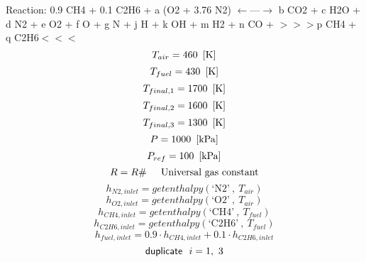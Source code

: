 \documentclass[10pt,fleqn]{article}
\newcommand{\F}[1]{\mbox{$#1$}}
\newcommand{\K}[1]{\mbox{\sf#1\ \ \mit}}
\newcommand{\SC}[1]{\mbox{`#1'}\  }
\newcommand{\I}{\mbox{\hspace{0.20in}}}
\begin{document}
\vspace{0.04in}
\noindent
\vspace{0.1 in}
\rm Reaction:   0.9 CH4  + 0.1 C2H6 +  a (O2 + 3.76 N2)   $\leftarrow$---$\rightarrow$  b CO2  +  c H2O  +  d N2  +  e O2  +  f O  +  g N  +  j H  +  k OH   +  m H2  +  n  CO +  $>$$>$$>$p CH4  +  q C2H6$<$$<$$<$
\begin{equation}
\label{EES Eqn:8}
T_{air} = 460   \   \left[ \rm K \right] 
\end{equation}
\rm
\begin{equation}
\label{EES Eqn:9}
T_{fuel} = 430   \   \left[ \rm K \right] 
\end{equation}
\rm
\begin{equation}
\label{EES Eqn:10}
T_{final,1}= 1700   \   \left[ \rm K \right] 
\end{equation}
\rm
\begin{equation}
\label{EES Eqn:11}
T_{final,2}= 1600   \   \left[ \rm K \right] 
\end{equation}
\rm
\begin{equation}
\label{EES Eqn:12}
T_{final,3}= 1300   \   \left[ \rm K \right] 
\end{equation}
\rm
\begin{equation}
\label{EES Eqn:13}
P = 1000   \   \left[ \rm kPa \right] 
\end{equation}
\rm
\begin{equation}
\label{EES Eqn:14}
P_{ref} = 100   \   \left[ \rm kPa \right] 
\end{equation}
\rm
\begin{equation}
\label{EES Eqn:15}
R = R\#  	 
\mbox{\I Universal gas constant}
\end{equation}
\begin{equation}
\label{EES Eqn:16}
h_{N2,inlet} = \F{getenthalpy}{ \left( \SC{N2},\ T_{air} \right) } 
\end{equation}
\begin{equation}
\label{EES Eqn:17}
h_{O2,inlet} = \F{getenthalpy}{ \left( \SC{O2},\ T_{air} \right) } 
\end{equation}
\begin{equation}
\label{EES Eqn:18}
h_{CH4,inlet} = \F{getenthalpy}{ \left( \SC{CH4},\ T_{fuel} \right) } 
\end{equation}
\begin{equation}
\label{EES Eqn:19}
h_{C2H6,inlet} = \F{getenthalpy}{ \left( \SC{C2H6},\ T_{fuel} \right) } 
\end{equation}
\begin{equation}
\label{EES Eqn:20}
h_{fuel,inlet} = 0.9 \cdot  h_{CH4,inlet} + 0.1 \cdot  h_{C2H6,inlet} 
\end{equation}
\begin{equation}
\label{EES Eqn:21}
\K{duplicate} i=1,\ 3 
\end{equation}
\end{document}
